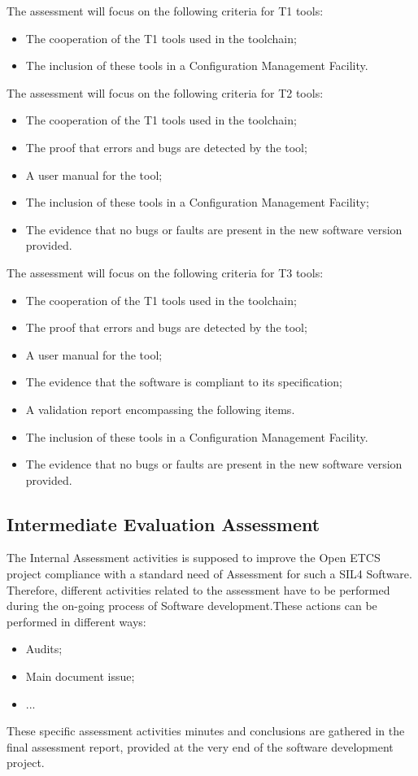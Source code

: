 \documentclass{template/openetcs_article}
\begin{document}
The assessment will focus on the following criteria for T1 tools:
\begin{itemize}
\item The cooperation of the T1 tools used in the toolchain;
\item The inclusion of these tools in a Configuration Management Facility.
\end{itemize}

The assessment will focus on the following criteria for T2 tools:
\begin{itemize}
\item The cooperation of the T1 tools used in the toolchain;
\item The proof that errors and bugs are detected by the tool;
\item A user manual for the tool;
\item The inclusion of these tools in a Configuration Management Facility;
\item The evidence that no bugs or faults are present in the new software version provided.
\end{itemize}

The assessment will focus on the following criteria for T3 tools:
\begin{itemize}
\item The cooperation of the T1 tools used in the toolchain;
\item The proof that errors and bugs are detected by the tool;
\item A user manual for the tool;
\item The evidence that the software is compliant to its specification;
\item A validation report encompassing the following items.
\item The inclusion of these tools in a Configuration Management Facility.
\item The evidence that no bugs or faults are present in the new software version provided.
\end{itemize}

\subsection{Intermediate Evaluation Assessment}
The Internal Assessment activities is supposed to improve the Open ETCS project compliance with a standard need of Assessment for such a SIL4 Software. Therefore, different activities related to the assessment have to be performed during the on-going process of Software development.These actions can be performed in different ways:
\begin{itemize}
\item Audits;
\item Main document issue;
\item ...
\end{itemize}
These specific assessment activities minutes and conclusions are gathered in the final assessment report, provided at the very end of the software development project.
\end{document}
